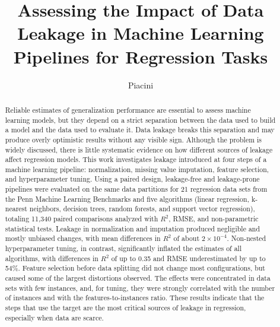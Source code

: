 \documentclass[ecp,tc,english]{infufrgs}
\title{Assessing the Impact of Data Leakage in Machine Learning Pipelines for Regression Tasks}
\author{Piacini}{Vinicius}
\begin{document}
\maketitle



\begin{abstract}
Reliable estimates of generalization performance are essential to assess machine
learning models, but they depend on a strict separation between the data used to
build a model and the data used to evaluate it. Data leakage breaks this
separation and may produce overly optimistic results without any visible sign.
Although the problem is widely discussed, there is little systematic evidence on
how different sources of leakage affect regression models. This work
investigates leakage introduced at four steps of a machine learning pipeline:
normalization, missing value imputation, feature selection, and hyperparameter
tuning. Using a paired design, leakage-free and leakage-prone pipelines were
evaluated on the same data partitions for 21 regression data sets from the Penn
Machine Learning Benchmarks and five algorithms (linear regression, k-nearest
neighbors, decision trees, random forests, and support vector regression),
totaling 11,340 paired comparisons analyzed with $R^2$, RMSE, and non-parametric
statistical tests. Leakage in normalization and imputation produced negligible
and mostly unbiased changes, with mean differences in $R^2$ of about
$2\times10^{-4}$. Non-nested hyperparameter tuning, in contrast, significantly
inflated the estimates of all algorithms, with differences in $R^2$ of up to 0.35
and RMSE underestimated by up to 54\%. Feature selection before data splitting
did not change most configurations, but caused some of the largest distortions
observed. The effects were concentrated in data sets with few instances, and,
for tuning, they were strongly correlated with the number of instances and with
the features-to-instances ratio. These results indicate that the steps that use
the target are the most critical sources of leakage in regression, especially
when data are scarce.
\end{abstract}
\end{document}
